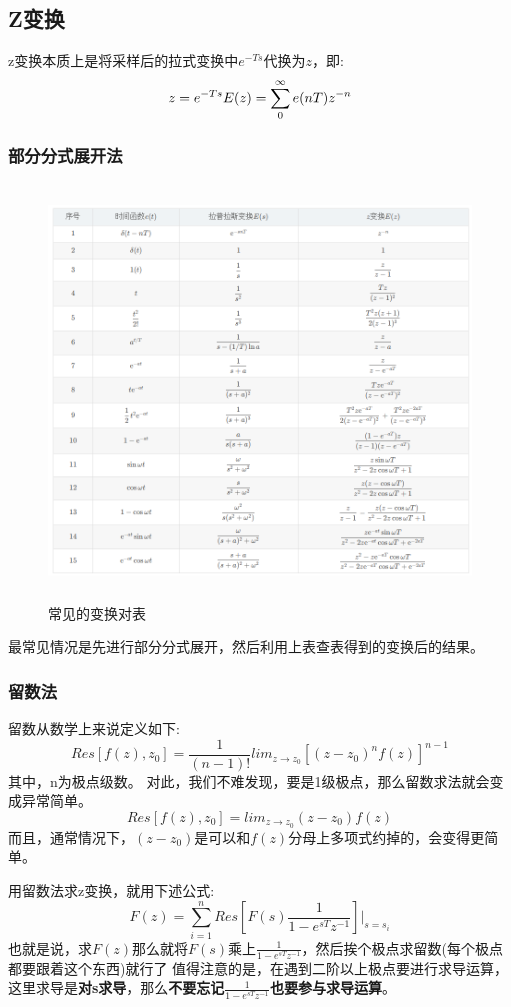 \documentclass[12pt, a4paper, oneside]{ctexbook}
\begin{document}
\subsection{Z变换}
z变换本质上是将采样后的拉式变换中$e^{-Ts}$代换为$z$，即:
$$
z=e^{-Ts}\\
E(z)=\sum_{0}^{\infty}e(nT)z^{-n}
$$
\subsubsection{部分分式展开法}
\begin{figure}[htbp]
	\centering
	\includegraphics[width=16cm,height=11cm]{img/2_1.png}
	\caption{常见的变换对表}
\end{figure}

最常见情况是先进行部分分式展开，然后利用上表查表得到的变换后的结果。
\subsubsection{留数法}
留数从数学上来说定义如下:
$$
Res[f(z),z_0]=\frac{1}{(n-1)!}lim_{z\rightarrow z_0}[(z-z_0)^nf(z)]^{n-1}
$$
其中，n为极点级数。
对此，我们不难发现，要是1级极点，那么留数求法就会变成异常简单。
$$
Res[f(z),z_0]=lim_{z\rightarrow z_0}(z-z_0)f(z)
$$
而且，通常情况下，$(z-z_0)$是可以和$f(z)$分母上多项式约掉的，会变得更简单。

用留数法求z变换，就用下述公式:
$$
F(z)=\sum_{i=1}^nRes[F(s)\frac{1}{1-e^{sT}z^{-1}}]\bigg|_{s=s_i}
$$
也就是说，求$F(z)$那么就将$F(s)$乘上$\frac{1}{1-e^{sT}z^{-1}}$，然后挨个极点求留数(每个极点都要跟着这个东西)就行了
值得注意的是，在遇到二阶以上极点要进行求导运算，这里求导是\textbf{对s求导}，那么\textbf{不要忘记$\frac{1}{1-e^{sT}z^{-1}}$也要参与求导运算}。
\end{document}
